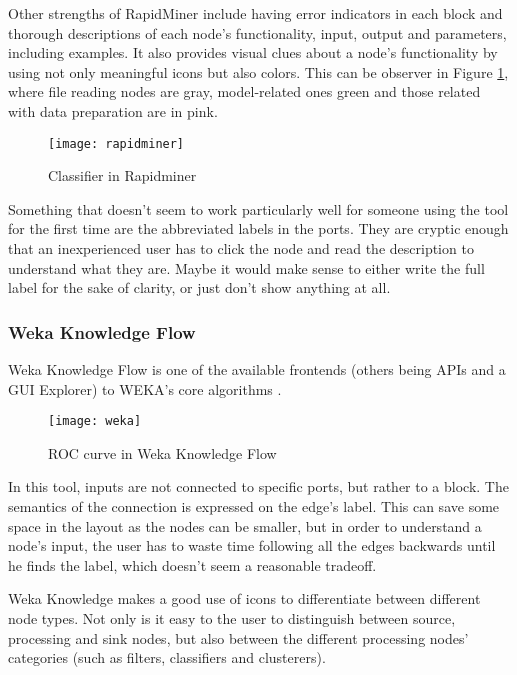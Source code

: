 Other strengths of RapidMiner include having error indicators in each block
and thorough descriptions of each
node's functionality, input, output and parameters, including examples. It also
provides visual clues about a node's functionality by using not only meaningful
icons but also colors. This can be observer in Figure \ref{fig:rapidminer},
where file reading nodes are gray, model-related ones green and those related
with data preparation are in pink.

\begin{figure}[t]
  \begin{center}
    \leavevmode
    \texttt{[image: rapidminer]}
    \caption{Classifier in Rapidminer \cite{rapidminer}}
    \label{fig:rapidminer}
  \end{center}
\end{figure}

Something that doesn't seem to work particularly well for someone using the tool
for the first time are the abbreviated labels in the ports. They are cryptic
enough that an inexperienced user has to click the node and read the description
to understand what they are. Maybe it would make sense to either write the full
label for the sake of clarity, or just don't show anything at all.

\subsubsection{Weka Knowledge Flow}

Weka Knowledge Flow is one of the available frontends (others being APIs and a GUI Explorer)
to WEKA's core algorithms \cite{weka}.

\begin{figure}[t]
  \begin{center}
    \leavevmode
    \texttt{[image: weka]}
    \caption{ROC curve in Weka Knowledge Flow \cite{weka}}
    \label{fig:weka}
  \end{center}
\end{figure}

In this tool, inputs are not connected to specific ports, but rather to a block.
The semantics of the connection is expressed on the edge's label. This can save
some space in the layout as the nodes can be smaller, but in order to understand
a node's input, the user has to waste time following all the edges backwards
until he finds the label, which doesn't seem a reasonable tradeoff.

Weka Knowledge makes a good use of icons to differentiate between different node
types. Not only is it easy to the user to distinguish between source, processing
and sink nodes, but also between the different processing nodes' categories
(such as filters, classifiers and clusterers).


